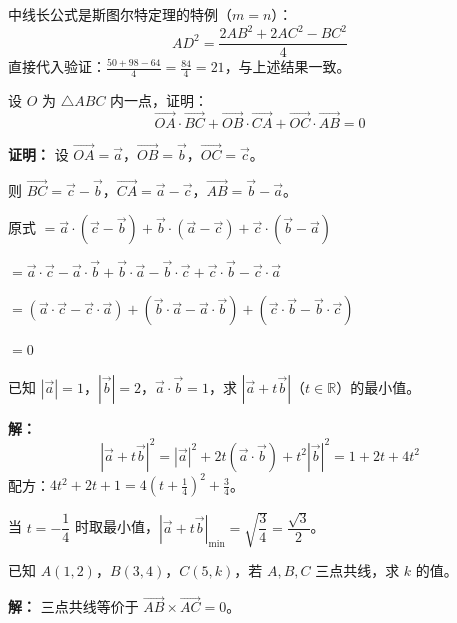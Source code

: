 \documentclass[12pt, a4paper]{ctexart}
\begin{document}
\begin{tipbox}[方法总结]
中线长公式是斯图尔特定理的特例（$m=n$）：
\[
AD^2 = \frac{2AB^2 + 2AC^2 - BC^2}{4}
\]
直接代入验证：$\frac{50+98-64}{4} = \frac{84}{4} = 21$，与上述结果一致。
\end{tipbox}

\begin{examplebox}[【例题5】向量恒等式证明几何命题]
设 $O$ 为 $\triangle ABC$ 内一点，证明：
\[
\overrightarrow{OA} \cdot \overrightarrow{BC} + \overrightarrow{OB} \cdot \overrightarrow{CA} + \overrightarrow{OC} \cdot \overrightarrow{AB} = 0
\]
\end{examplebox}

\textbf{证明：} 设 $\overrightarrow{OA}=\vec{a}$，$\overrightarrow{OB}=\vec{b}$，$\overrightarrow{OC}=\vec{c}$。

则 $\overrightarrow{BC}=\vec{c}-\vec{b}$，$\overrightarrow{CA}=\vec{a}-\vec{c}$，$\overrightarrow{AB}=\vec{b}-\vec{a}$。

原式 $= \vec{a}\cdot(\vec{c}-\vec{b}) + \vec{b}\cdot(\vec{a}-\vec{c}) + \vec{c}\cdot(\vec{b}-\vec{a})$

$= \vec{a}\cdot\vec{c} - \vec{a}\cdot\vec{b} + \vec{b}\cdot\vec{a} - \vec{b}\cdot\vec{c} + \vec{c}\cdot\vec{b} - \vec{c}\cdot\vec{a}$

$= (\vec{a}\cdot\vec{c} - \vec{c}\cdot\vec{a}) + (\vec{b}\cdot\vec{a} - \vec{a}\cdot\vec{b}) + (\vec{c}\cdot\vec{b} - \vec{b}\cdot\vec{c})$

$= 0$

\begin{examplebox}[【例题6】极化恒等式求模长范围]
已知 $|\vec{a}|=1$，$|\vec{b}|=2$，$\vec{a}\cdot\vec{b}=1$，求 $|\vec{a}+t\vec{b}|$（$t\in\mathbb{R}$）的最小值。
\end{examplebox}

\textbf{解：}
\[
|\vec{a}+t\vec{b}|^2 = |\vec{a}|^2 + 2t(\vec{a}\cdot\vec{b}) + t^2|\vec{b}|^2 = 1 + 2t + 4t^2
\]
配方：$4t^2 + 2t + 1 = 4\left(t+\frac{1}{4}\right)^2 + \frac{3}{4}$。

当 $t = -\dfrac{1}{4}$ 时取最小值，$|\vec{a}+t\vec{b}|_{\min} = \sqrt{\dfrac{3}{4}} = \dfrac{\sqrt{3}}{2}$。

\begin{examplebox}[【例题7】叉积判断三点共线]
已知 $A(1,2)$，$B(3,4)$，$C(5,k)$，若 $A, B, C$ 三点共线，求 $k$ 的值。
\end{examplebox}

\textbf{解：} 三点共线等价于 $\overrightarrow{AB} \times \overrightarrow{AC} = 0$。
\end{document}
